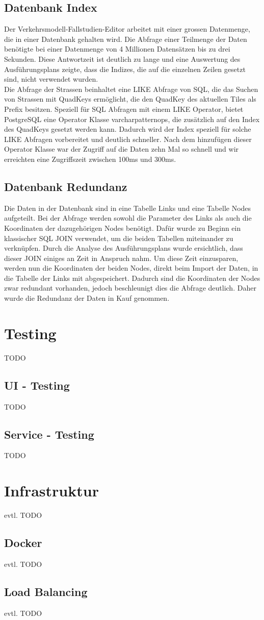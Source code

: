 \subsection{Datenbank Index}
Der Verkehrsmodell-Fallstudien-Editor arbeitet mit einer grossen Datenmenge, die in einer Datenbank gehalten wird. Die Abfrage einer Teilmenge der Daten benötigte bei einer Datenmenge von 4 Millionen Datensätzen bis zu drei Sekunden. Diese Antwortzeit ist deutlich zu lange und eine Auswertung des Ausführungsplans zeigte, dass die Indizes, die auf die einzelnen Zeilen gesetzt sind, nicht verwendet wurden.\\
Die Abfrage der Strassen beinhaltet eine LIKE Abfrage von SQL, die das Suchen von Strassen mit QuadKeys ermöglicht, die den QuadKey des aktuellen Tiles als Prefix besitzen. Speziell für SQL Abfragen mit einem LIKE Operator, bietet PostgreSQL eine Operator Klasse \glqq{}varchar\textunderscore pattern\textunderscore ops\grqq{}, die zusätzlich auf den Index des QuadKeys gesetzt werden kann. Dadurch wird der Index speziell für solche LIKE Abfragen vorbereitet und deutlich schneller. Nach dem hinzufügen dieser Operator Klasse war der Zugriff auf die Daten zehn Mal so schnell und wir erreichten eine Zugriffszeit zwischen 100ms und 300ms.
\subsection{Datenbank Redundanz}
Die Daten in der Datenbank sind in eine Tabelle \glqq{}Links\grqq{} und eine Tabelle \glqq{}Nodes\grqq{} aufgeteilt. Bei der Abfrage werden sowohl die Parameter des Links als auch die Koordinaten der dazugehörigen Nodes benötigt. Dafür wurde zu Beginn ein klassischer SQL JOIN verwendet, um die beiden Tabellen miteinander zu verknüpfen. Durch die Analyse des Ausführungsplans wurde ersichtlich, dass dieser JOIN einiges an Zeit in Anspruch nahm. Um diese Zeit einzusparen, werden nun die Koordinaten der beiden Nodes, direkt beim Import der Daten, in die Tabelle der Links mit abgespeichert. Dadurch sind die Koordinaten der Nodes zwar redundant vorhanden, jedoch beschleunigt dies die Abfrage deutlich. Daher wurde die Redundanz der Daten in Kauf genommen.
\newpage
\section{Testing}
TODO
\subsection{UI - Testing}
TODO
\subsection{Service - Testing}
TODO
\section{Infrastruktur}
evtl. TODO
\subsection{Docker}
evtl. TODO
\subsection{Load Balancing}
evtl. TODO